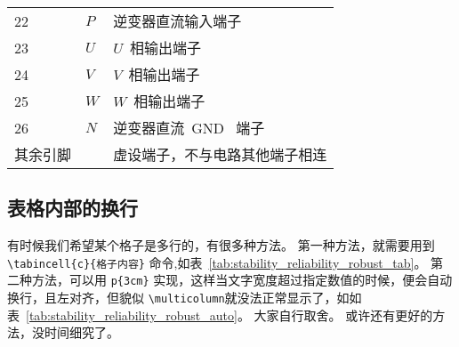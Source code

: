 \begin{table}[ht]
\begin{tabular}{C{3.6cm}L{1.8cm}L{7.2cm}}
    22            & $P$           & 逆变器直流输入端子             \\
    23            & $U$           & $U$~相输出端子                 \\
    24            & $V$           & $V$~相输出端子                 \\
    25            & $W$           & $W$~相输出端子                 \\
    26            & $N$           & 逆变器直流~GND~ 端子           \\
    其余引脚      &               & 虚设端子，不与电路其他端子相连 \\
    \bottomrule
  \end{tabular}
\end{table}

\subsection{表格内部的换行}
有时候我们希望某个格子是多行的，有很多种方法。
第一种方法，就需要用到 \verb|\tabincell{c}{格子内容}| 命令,如表~\ref{tab:stability_reliability_robust_tab}。
第二种方法，可以用 \verb|p{3cm}| 实现，这样当文字宽度超过指定数值的时候，便会自动换行，且左对齐，但貌似 \verb|\multicolumn|就没法正常显示了，如如表~\ref{tab:stability_reliability_robust_auto}。
大家自行取舍。
或许还有更好的方法，没时间细究了。


